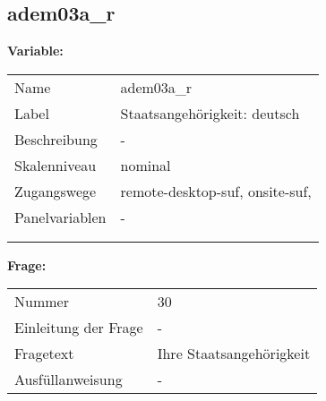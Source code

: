 	
	
	\subsection{adem03a\_r}
	\label{subSection:adem03a_r}

	\noindent\textbf{Variable:}\\
		\begin{tabular}{lL{11.3cm}}
			\label{tableVariable:adem03a_r}
			Name & adem03a\_r \\
			Label & Staatsangehörigkeit: deutsch \\
			Beschreibung & - \\
			Skalenniveau & nominal \\
			Zugangswege &
				remote-desktop-suf,
				onsite-suf,
 \\
			Panelvariablen & -
			 \\
			 \\
 \\
		\end{tabular}

		\vspace*{1 cm}
		\noindent\textbf{Frage:}\\
		\begin{tabular}{lL{11.3cm}}
			\label{tableQuestion:adem03a_r}
			Nummer & 30 \\
			Einleitung der Frage & - \\
			Fragetext & Ihre Staatsangehörigkeit \\
			Ausfüllanweisung & - \\
		\end{tabular}






